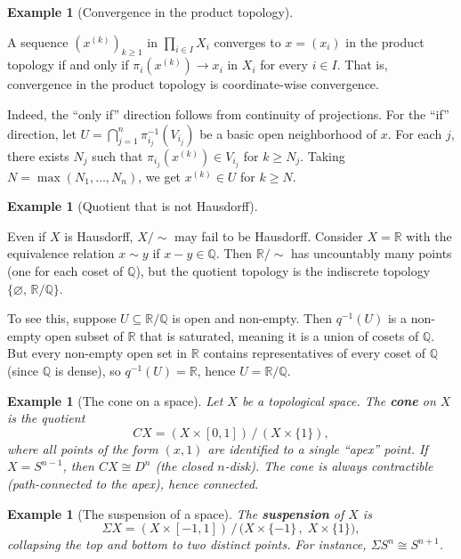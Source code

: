 \documentclass[11pt,a4paper,twoside]{book}
\theoremstyle{remark}
\theoremstyle{definition}
\newtheorem{exampleplain}[theorem]{Example}
\theoremstyle{definition}
\newenvironment{example}[1][]{%
  \begin{exampleplain}[#1]\itshape
}{%
  \end{exampleplain}
}
\begin{document}
\begin{example}[Convergence in the product topology]
\label{ex:product-convergence}
A sequence $(x^{(k)})_{k\ge 1}$ in $\prod_{i\in I}X_i$
converges to $x=(x_i)$ in the product topology if and only if
$\pi_i(x^{(k)})\to x_i$ in $X_i$ for every $i\in I$.  That is,
convergence in the product topology is coordinate-wise convergence.

Indeed, the ``only if'' direction follows from continuity of
projections.  For the ``if'' direction, let $U=\bigcap_{j=1}^n
\pi_{i_j}^{-1}(V_{i_j})$ be a basic open neighborhood of $x$.
For each $j$, there exists $N_j$ such that $\pi_{i_j}(x^{(k)})
\in V_{i_j}$ for $k\ge N_j$.  Taking $N=\max(N_1,\dots,N_n)$,
we get $x^{(k)}\in U$ for $k\ge N$.
\end{example}

\begin{example}[Quotient that is not Hausdorff]
\label{ex:quotient-not-hausdorff}
Even if $X$ is Hausdorff, $X/{\sim}$ may fail to be Hausdorff.
Consider $X=\mathbb{R}$ with the equivalence relation $x\sim y$ if
$x-y\in\mathbb{Q}$.  Then $\mathbb{R}/{\sim}$ has uncountably many
points (one for each coset of $\mathbb{Q}$), but the quotient
topology is the indiscrete topology $\{\varnothing,\,\mathbb{R}/\mathbb{Q}\}$.

To see this, suppose $U\subseteq\mathbb{R}/\mathbb{Q}$ is open
and non-empty.  Then $q^{-1}(U)$ is a non-empty open subset of
$\mathbb{R}$ that is saturated, meaning it is a union of cosets
of $\mathbb{Q}$.  But every non-empty open set in $\mathbb{R}$
contains representatives of every coset of $\mathbb{Q}$ (since
$\mathbb{Q}$ is dense), so $q^{-1}(U)=\mathbb{R}$, hence
$U=\mathbb{R}/\mathbb{Q}$.
\end{example}

\begin{example}[The cone on a space]\label{ex:cone}
Let $X$ be a topological space.  The \textbf{cone} on $X$ is the
quotient
\[
   CX = (X\times[0,1])\,\big/\,(X\times\{1\}),
\]
where all points of the form $(x,1)$ are identified to a single
``apex'' point.  If $X=S^{n-1}$, then $CX\cong D^n$ (the closed
$n$-disk).  The cone is always contractible (path-connected to
the apex), hence connected.
\end{example}

\begin{example}[The suspension of a space]\label{ex:suspension}
The \textbf{suspension} of $X$ is
\[
   \Sigma X = (X\times[-1,1])\,\big/\,\bigl(X\times\{-1\}\,,\;
              X\times\{1\}\bigr),
\]
collapsing the top and bottom to two distinct points.  For instance,
$\Sigma S^n\cong S^{n+1}$.
\end{example}
\end{document}
